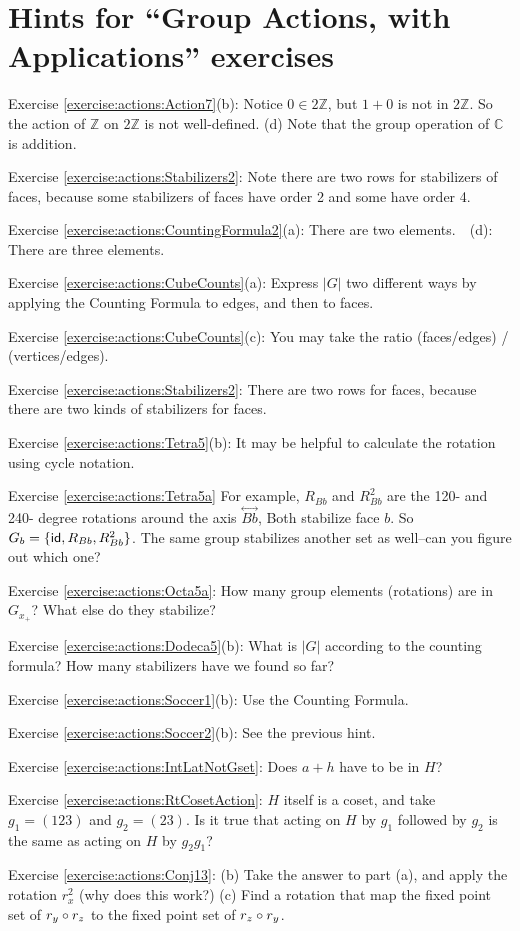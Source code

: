 \section{Hints for ``Group Actions, with Applications'' exercises}\label{sec:actions:hints} 


\noindent Exercise \ref{exercise:actions:Action7}(b): Notice $0 \in 2\mathbb{Z}$, but $1+0$ is not in $2\mathbb{Z}$. So the action of $\mathbb{Z}$ on $2\mathbb{Z}$ is not well-defined. (d) Note that the group operation of $\mathbb{C}$ is addition.

\noindent Exercise \ref{exercise:actions:Stabilizers2}: Note there are two rows for stabilizers of faces, because some stabilizers of faces have order 2 and some have order 4.

\noindent Exercise \ref{exercise:actions:CountingFormula2}(a):   There are two elements.~~(d):   There are three elements.

\noindent Exercise \ref{exercise:actions:CubeCounts}(a):   Express $|G|$ two different ways by applying the Counting Formula to edges, and then to faces.

\noindent Exercise \ref{exercise:actions:CubeCounts}(c):  You may take the ratio (faces/edges) / (vertices/edges).

\noindent Exercise \ref{exercise:actions:Stabilizers2}:   There are two rows for faces, because there are two kinds of stabilizers for faces.

\noindent Exercise \ref{exercise:actions:Tetra5}(b): It may be helpful to calculate the rotation using cycle notation.

\noindent Exercise \ref{exercise:actions:Tetra5a} For example, $R_{Bb}$ and  $R_{Bb}^2$ are the 120- and 240- degree rotations around the axis $\overset{\leftrightarrow}{Bb}$, Both stabilize face $b$. So 
$G_b = \{ {\sf{i}d}, R_{Bb}, R_{Bb}^2 \}$. The same group stabilizes another set as well--can you figure out which one?  


\noindent Exercise \ref{exercise:actions:Octa5a}: How many group elements (rotations) are in $G_{x_+}$?  What else do they stabilize?

\noindent Exercise \ref{exercise:actions:Dodeca5}(b): What is $|G|$ according to the counting formula?  How many stabilizers have we found so far?

\noindent Exercise \ref{exercise:actions:Soccer1}(b): Use the Counting Formula.

\noindent Exercise \ref{exercise:actions:Soccer2}(b): See the previous hint.

\noindent Exercise \ref{exercise:actions:IntLatNotGset}: Does $a+h$ have to be in $H$?

\noindent Exercise \ref{exercise:actions:RtCosetAction}: $H$ itself is a coset, and take $g_1=(123)$ and $g_2=(23)$.  Is it true that acting on $H$ by $g_1$ followed by $g_2$ is the same as acting on $H$ by $g_2 g_1$?

\noindent Exercise \ref{exercise:actions:Conj13}: (b) Take the answer to part (a), and apply the rotation $r_x^2$ (why does this work?)  (c) Find a rotation that map the fixed point set of $r_y\circ r_z$ to the fixed point set of  $r_z\circ r_y$.
